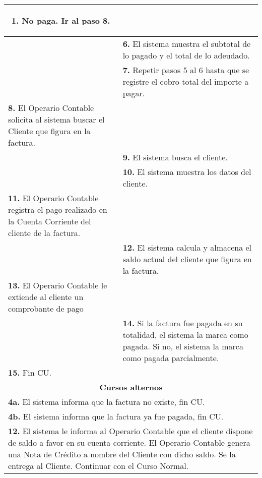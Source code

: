 \documentclass[12pt]{extarticle}
\begin{document}
\begin{longtable}{ |p{8cm}|p{8cm}| }
\begin{enumerate}[label=(\alph*)]
                    \item No paga. Ir al paso 8.
                \end{enumerate}
            & \\
            \hline
            & \textbf{6. }El sistema muestra el subtotal de lo pagado y el total de lo adeudado.\\
            \hline
            & \textbf{7. }Repetir pasos 5 al 6 hasta que se registre el cobro total del importe a pagar.\\
            \hline
			\textbf{8. }El Operario Contable solicita al sistema buscar el Cliente que figura en la factura.& \\
            \hline
            & \textbf{9. }El sistema busca el cliente.\\
            \hline
            & \textbf{10. }El sistema muestra los datos del cliente.\\
            \hline
            \textbf{11. }El Operario Contable registra el pago realizado en la Cuenta Corriente del cliente de la factura.&\\
            \hline
            & \textbf{12. }El sistema calcula y almacena el saldo actual del cliente que figura en la factura.\\
            \hline
			\textbf{13. }El Operario Contable le extiende al cliente un comprobante de pago & \\
            \hline
            & \textbf{14. }Si la factura fue pagada en su totalidad, el sistema la marca como pagada. Si no, el sistema la marca como pagada parcialmente.\\
            \hline
			\textbf{15. }Fin CU. & \\
		\hline
		\multicolumn{2}{|c|}{\textbf{Cursos alternos}}\\
		\hline
		\multicolumn{2}{|p{16cm}|}{\textbf{4a. } El sistema informa que la factura no existe, fin CU.}\\
		\hline	
        \multicolumn{2}{|p{16cm}|}{\textbf{4b. } El sistema informa que la factura ya fue pagada, fin CU.}\\
		\hline	
        \multicolumn{2}{|p{16cm}|}{\textbf{12. } El sistema le informa al Operario Contable que el cliente dispone de saldo a favor en su cuenta corriente. El Operario Contable genera una Nota de Crédito a nombre del Cliente con dicho saldo. Se la entrega al Cliente. Continuar con el Curso Normal.}\\
		\hline	
	\end{longtable}
\end{document}
